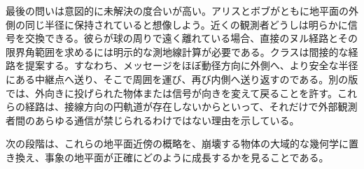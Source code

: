 最後の問いは意図的に未解決の度合いが高い。アリスとボブがともに地平面の外側の同じ半径に保持されていると想像しよう。近くの観測者どうしは明らかに信号を交換できる。彼らが球の周りで遠く離れている場合、直接のヌル経路とその限界角範囲を求めるには明示的な測地線計算が必要である。クラスは間接的な経路を提案する。すなわち、メッセージをほぼ動径方向に外側へ、より安全な半径にある中継点へ送り、そこで周囲を運び、再び内側へ送り返すのである。別の版では、外向きに投げられた物体または信号が向きを変えて戻ることを許す。これらの経路は、接線方向の円軌道が存在しないからといって、それだけで外部観測者間のあらゆる通信が禁じられるわけではない理由を示している。

\begin{classroomqa}
\end{classroomqa}

次の段階は、これらの地平面近傍の概略を、崩壊する物体の大域的な幾何学に置き換え、事象の地平面が正確にどのように成長するかを見ることである。
